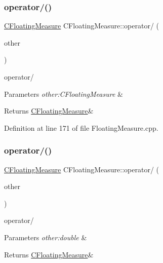 \subsubsection{\texorpdfstring{operator/()}{operator/()}\hspace{0.1cm}{\footnotesize\ttfamily [1/2]}}
{\footnotesize\ttfamily \hyperlink{classCFloatingMeasure}{C\+Floating\+Measure} C\+Floating\+Measure\+::operator/ (\begin{DoxyParamCaption}\item[{const \hyperlink{classCFloatingMeasure}{C\+Floating\+Measure} \&}]{other }\end{DoxyParamCaption})}



operator/ 


\begin{DoxyParams}{Parameters}
{\em other\+:\+C\+Floating\+Measure} & \\
\hline
\end{DoxyParams}
\begin{DoxyReturn}{Returns}
\hyperlink{classCFloatingMeasure}{C\+Floating\+Measure}\& 
\end{DoxyReturn}


Definition at line 171 of file Floating\+Measure.\+cpp.

\mbox{\label{classCFloatingMeasure_ac39b5a05cce42097d4439627aaaaf94c}} 
\subsubsection{\texorpdfstring{operator/()}{operator/()}\hspace{0.1cm}{\footnotesize\ttfamily [2/2]}}
{\footnotesize\ttfamily \hyperlink{classCFloatingMeasure}{C\+Floating\+Measure} C\+Floating\+Measure\+::operator/ (\begin{DoxyParamCaption}\item[{const double \&}]{other }\end{DoxyParamCaption})}



operator/ 


\begin{DoxyParams}{Parameters}
{\em other\+:double} & \\
\hline
\end{DoxyParams}
\begin{DoxyReturn}{Returns}
\hyperlink{classCFloatingMeasure}{C\+Floating\+Measure}\& 
\end{DoxyReturn}


